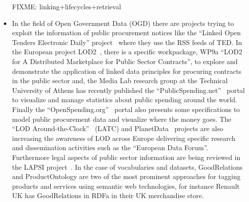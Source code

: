 \begin{itemize}
  FIXME: linking+lifecycles+retrieval
  
 \item In the field of Open Government Data (OGD) there are projects trying to exploit the 
 information of public procurement notices like the ``Linked Open Tenders Electronic Daily'' project~\cite{loted} 
 where they use the RSS feeds of TED.  In the European project LOD2~\cite{lod2-project}, there is a specific workpackage, 
 WP9a ``LOD2 for A Distributed Marketplace for Public Sector Contracts'', to explore and demonstrate the 
 application of linked data principles for procuring contracts in the public sector and, 
 the Media Lab research group at the Technical University of Athens has recently published the 
 ``PublicSpending.net''~\cite{publicspending} portal to visualize and manage statistics about public spending around the world. Finally the 
 ``OpenSpending.org''~\cite{open-spending} portal also presents some specifications to model public procurement data and 
 visualize where the money goes. The ``LOD Around-the-Clock''~\cite{latc-project} (LATC) and PlanetData~\cite{planet-data-project} projects are also increasing the awareness of 
 LOD across Europe delivering specific research and dissemination activities such as the 
 ``European Data Forum''. Furthermore legal aspects of public sector information are being reviewed in the 
 LAPSI project~\cite{lapsi-project}. In the case of vocabularies and datasets, GoodRelations 
 and ProductOntology are two of the most prominent approaches for tagging products and services using semantic web technologies, 
 for instance Renault UK has GoodRelations in RDFa in their UK merchandise store.

\end{itemize}


